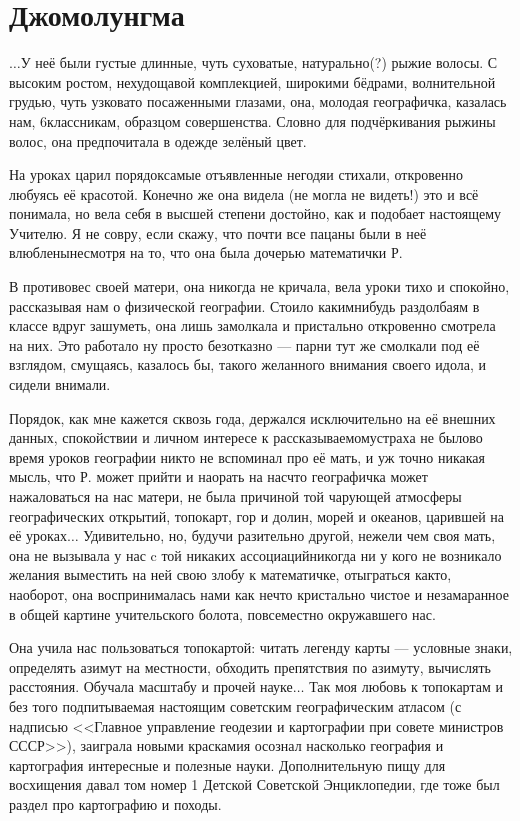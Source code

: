 \newpage
\section*{Джомолунгма}

$\ldots$У неё были густые длинные, чуть суховатые, натурально(?) рыжие волосы. С высоким ростом, нехудощавой комплекцией, широкими бёдрами, волнительной грудью, чуть узковато посаженными глазами, она, молодая географичка, казалась нам, 6\sdash классникам, образцом совершенства. Словно для подчёркивания рыжины волос, она предпочитала в одежде зелёный цвет. 

На уроках царил порядок\mdash самые отъявленные негодяи стихали, откровенно любуясь её красотой. Конечно же она видела (не могла не видеть!) это и всё понимала, но вела себя в высшей степени достойно, как и подобает настоящему Учителю. Я не совру, если скажу, что почти все пацаны были в неё влюблены\mdash несмотря на то, что она была дочерью математички Р.

В противовес своей матери, она никогда не кричала, вела уроки тихо и спокойно, рассказывая нам о физической географии. Стоило каким\sdash нибудь раздолбаям в классе вдруг зашуметь, она лишь замолкала и пристально откровенно смотрела на них. Это работало ну просто безотказно — парни тут же смолкали под её взглядом, смущаясь, казалось бы, такого желанного внимания своего идола, и сидели внимали. 

Порядок, как мне кажется сквозь года, держался исключительно на её внешних данных, спокойствии и личном интересе к рассказываемому\mdash страха не было\mdash во время уроков географии никто не вспоминал про её мать, и уж точно никакая мысль, что Р. может прийти и наорать на нас\mdash что географичка может нажаловаться на нас матери, не была причиной той чарующей атмосферы географических открытий, топокарт, гор и долин, морей и океанов, царившей на её уроках$\ldots$ Удивительно, но, будучи разительно другой, нежели чем своя мать, она не вызывала у нас c той никаких ассоциаций\mdash никогда ни у кого не возникало желания выместить на ней свою злобу к математичке, отыграться как\sdash то, наоборот, она воспринималась нами как нечто кристально чистое и незамаранное в общей картине учительского болота, повсеместно окружавшего нас.
 
Она учила нас пользоваться топокартой: читать легенду карты — условные знаки, определять азимут на местности, обходить препятствия по азимуту, вычислять расстояния. Обучала масштабу и прочей науке$\ldots$ Так моя любовь к топокартам и без того подпитываемая настоящим советским географическим атласом (с надписью <<Главное управление геодезии и картографии при совете министров СССР>>), заиграла новыми красками\mdash я осознал насколько география и картография интересные и полезные науки. Дополнительную пищу для восхищения давал том номер 1 Детской Советской Энциклопедии, где тоже был раздел про картографию и походы. 

